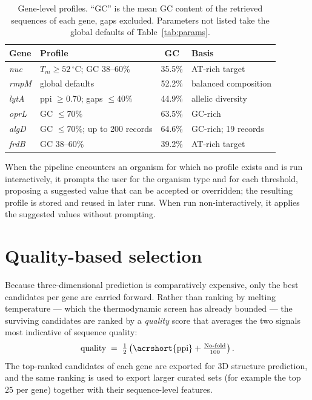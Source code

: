 \begin{table}[H]
\begin{center}
\begin{tabular}{@{}l l c p{4.3cm}@{}}
\hline
\textbf{Gene} & \textbf{Profile} & \textbf{GC} & \textbf{Basis} \\
\hline
\emph{nuc}  & $T_m \geq 52\,^{\circ}$C; GC 38--60\%        & 35.5\% & AT-rich target \\
\emph{rmpM} & global defaults                              & 52.2\% & balanced composition \\
\emph{lytA} & \acrshort{ppi} $\geq 0.70$; gaps $\leq 40\%$ & 44.9\% & allelic diversity \citep{obregon2002} \\
\emph{oprL} & GC $\leq 70\%$                               & 63.5\% & GC-rich \citep{stover2000} \\
\emph{algD} & GC $\leq 70\%$; up to 200 records            & 64.6\% & GC-rich; 19 records \\
\emph{frdB} & GC 38--60\%                                  & 39.2\% & AT-rich target \\
\hline
\end{tabular}
\end{center}
\caption{Gene-level profiles. ``GC'' is the mean GC content of the retrieved sequences of each gene,
gaps excluded. Parameters not listed take the global defaults of Table~\ref{tab:params}.}
\label{tab:geneprofiles}
\end{table}

When the pipeline encounters an organism for which no profile exists and is run interactively, it prompts
the user for the organism type and for each threshold, proposing a suggested value that can be accepted or
overridden; the resulting profile is stored and reused in later runs. When run non-interactively, it applies
the suggested values without prompting.

\section{Quality-based selection}

Because three-dimensional prediction is comparatively expensive, only the best candidates per gene are
carried forward. Rather than ranking by melting temperature --- which the thermodynamic screen has already
bounded --- the surviving candidates are ranked by a \emph{quality} score that averages the two signals most
indicative of sequence quality:
\[
\text{quality} \;=\; \tfrac{1}{2}\left(\text{\acrshort{ppi}} + \tfrac{\text{No-fold}}{100}\right).
\]
The top-ranked candidates of each gene are exported for 3D structure prediction, and the same ranking is used to
export larger curated sets (for example the top $25$ per gene) together with their sequence-level features.

